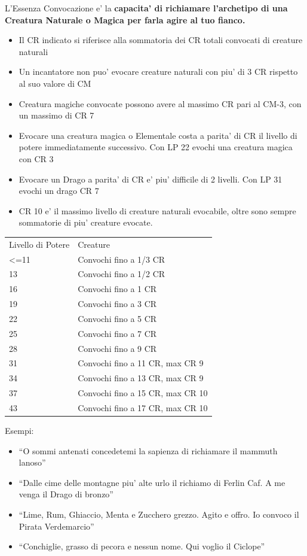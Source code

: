 \documentclass[a4paper,11pt,twoside,openany]{dndbook}
\begin{document}
L'Essenza Convocazione e' la \textbf{capacita' di richiamare l'archetipo di una Creatura Naturale o Magica per farla agire al tuo fianco.}
\begin{itemize}
\item 
Il CR indicato si riferisce alla sommatoria dei CR totali convocati di creature naturali 
\item 
Un incantatore non puo' evocare creature naturali con piu' di 3 CR rispetto al suo valore di CM 
\item 
Creatura magiche convocate possono avere al massimo CR pari al CM-3, con un massimo di CR 7 
\item 
Evocare una creatura magica o Elementale costa a parita' di CR il livello di potere immediatamente successivo. Con LP 22 evochi una creatura magica con CR 3 
\item 
Evocare un Drago a parita' di CR e' piu' difficile di 2 livelli. Con LP 31 evochi un drago CR 7 
\item 
CR 10 e' il massimo livello di creature naturali evocabile, oltre sono sempre sommatorie di piu' creature evocate. 
\end{itemize}

\bigskip

\begin{tabular}[c]{@{}ll@{}}
\toprule 

Livello di Potere & Creature\tabularnewline
\textless=11 & Convochi fino a 1/3 CR\tabularnewline
13 & Convochi fino a 1/2 CR\tabularnewline
16 & Convochi fino a 1 CR\tabularnewline
19 & Convochi fino a 3 CR\tabularnewline
22 & Convochi fino a 5 CR\tabularnewline
25 & Convochi fino a 7 CR\tabularnewline
28 & Convochi fino a 9 CR\tabularnewline
31 & Convochi fino a 11 CR, max CR 9\tabularnewline
34 & Convochi fino a 13 CR, max CR 9\tabularnewline
37 & Convochi fino a 15 CR, max CR 10\tabularnewline
43 & Convochi fino a 17 CR, max CR 10\tabularnewline
\bottomrule
\end{tabular}

\bigskip

Esempi:
\begin{itemize}
\item 
``O sommi antenati concedetemi la sapienza di richiamare il mammuth lanoso'' 
\item 
``Dalle cime delle montagne piu' alte urlo il richiamo di Ferlin Caf. A me venga il Drago di bronzo'' 
\item 
``Lime, Rum, Ghiaccio, Menta e Zucchero grezzo. Agito e offro. Io convoco il Pirata Verdemarcio'' 
\item 
``Conchiglie, grasso di pecora e nessun nome. Qui voglio il Ciclope'' 
\end{itemize}
\end{document}
